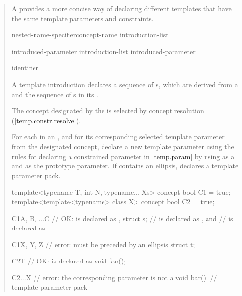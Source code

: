 \begin{quote}

\pnum
A  provides a more concise way of declaring
different templates that have the same template parameters and constraints.

\begin{bnf}
\br
  nested-name-specifier\opt concept-name \terminal{\{} introduction-list \terminal{\}}

\br
  introduced-parameter
  introduction-list \terminal{,} introduced-parameter

\br
    \opt identifier
\end{bnf}

A template introduction declares a sequence of 
s, which are derived from a 
 and the sequence of s in
its .

\pnum
The concept designated by the  is selected by 
concept resolution (\ref{temp.constr.resolve}).

\pnum
For each   in an
, and for its corresponding selected template 
parameter  from the designated concept, declare a new template
parameter using the rules for declaring a constrained parameter in
\ref{temp.param} by using  as a  and 
 as the prototype parameter.
% 
% 
If  contains an ellipsis,  declares a template 
parameter pack.
% 
\enterexample
\begin{codeblock}
template<typename T, int N, typename... Xs> concept bool C1 = true;
template<template<typename> class X> concept bool C2 = true;

C1{A, B, ...C} // OK:  is declared as ,
struct s;      //  is declared as , and
               //  is declared as 

C1{X, Y, Z} // error:  must be preceded by an ellipsis
struct t;

C2{T} // OK:  is declared as 
void foo();

C2{...X}    // error: the corresponding parameter is not a 
void bar(); // template parameter pack
\end{codeblock}
\exitexample



\end{quote}
